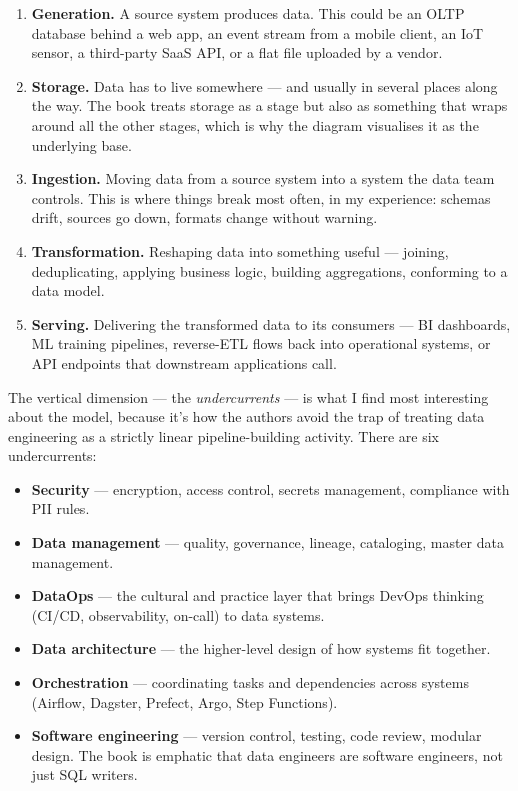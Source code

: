 \begin{enumerate}[leftmargin=*]
  \item \textbf{Generation.} A source system produces data. This could be an OLTP database behind a web app, an event stream from a mobile client, an IoT sensor, a third-party SaaS API, or a flat file uploaded by a vendor.
  \item \textbf{Storage.} Data has to live somewhere — and usually in several places along the way. The book treats storage as a stage but also as something that wraps around all the other stages, which is why the diagram visualises it as the underlying base.
  \item \textbf{Ingestion.} Moving data from a source system into a system the data team controls. This is where things break most often, in my experience: schemas drift, sources go down, formats change without warning.
  \item \textbf{Transformation.} Reshaping data into something useful — joining, deduplicating, applying business logic, building aggregations, conforming to a data model.
  \item \textbf{Serving.} Delivering the transformed data to its consumers — BI dashboards, ML training pipelines, reverse-ETL flows back into operational systems, or API endpoints that downstream applications call.
\end{enumerate}

The vertical dimension — the \emph{undercurrents} — is what I find most interesting about the model, because it's how the authors avoid the trap of treating data engineering as a strictly linear pipeline-building activity. There are six undercurrents:

\begin{itemize}[leftmargin=*]
  \item \textbf{Security} — encryption, access control, secrets management, compliance with PII rules.
  \item \textbf{Data management} — quality, governance, lineage, cataloging, master data management.
  \item \textbf{DataOps} — the cultural and practice layer that brings DevOps thinking (CI/CD, observability, on-call) to data systems.
  \item \textbf{Data architecture} — the higher-level design of how systems fit together.
  \item \textbf{Orchestration} — coordinating tasks and dependencies across systems (Airflow, Dagster, Prefect, Argo, Step Functions).
  \item \textbf{Software engineering} — version control, testing, code review, modular design. The book is emphatic that data engineers are software engineers, not just SQL writers.
\end{itemize}

